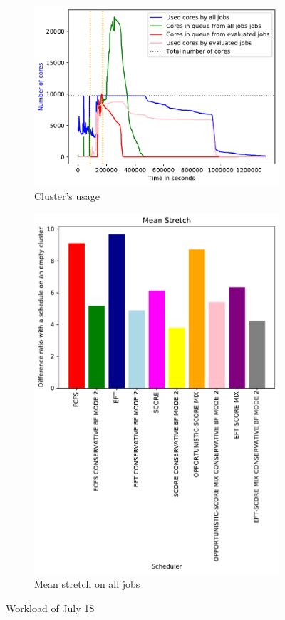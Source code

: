 \documentclass[a4paper]{article}
\begin{document}
\begin{figure}[H]\centering
\begin{subfigure}[b]{0.4\linewidth}\centering\includegraphics[width=1\linewidth]{MBSS/plot/2022-07-18->2022-07-18_V9271_Fcfs_Used_nodes_450_128_32_256_4_1024.pdf}\caption{Cluster's usage}\end{subfigure}
\begin{subfigure}[b]{0.4\linewidth}\centering\includegraphics[width=0.9\linewidth]{MBSS/plot/Results_FCFS_Score_Backfill_2022-07-18->2022-07-18_V10000_Mean_Stretch_450_128_32_256_4_1024.pdf}\caption{Mean stretch on all jobs}\end{subfigure}
\caption{Workload of July 18}\end{figure}
\end{document}
